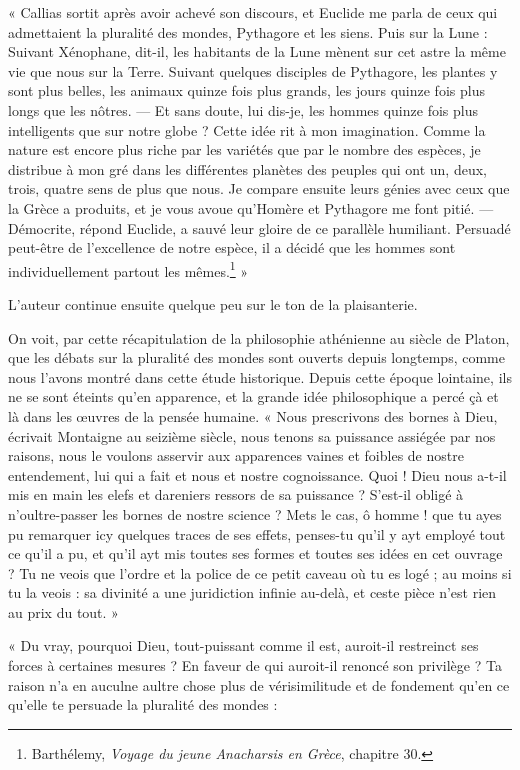 \documentclass[a4paper, 11pt, oneside]{article}
\begin{document}
« Callias sortit après avoir achevé son discours, et Euclide me parla de ceux qui admettaient la pluralité des mondes, Pythagore et les siens. Puis sur la Lune : Suivant Xénophane, dit-il, les habitants de la Lune mènent sur cet astre la même vie que nous sur la Terre. Suivant quelques disciples de Pythagore, les plantes y sont plus belles, les animaux quinze fois plus grands, les jours quinze fois plus longs que les nôtres. --- Et sans doute, lui dis-je, les hommes quinze fois plus intelligents que sur notre globe ? Cette idée rit à mon imagination. Comme la nature est encore plus riche par les variétés que par le nombre des espèces, je distribue à mon gré dans les différentes planètes des peuples qui ont un, deux, trois, quatre sens de plus que nous. Je compare ensuite leurs génies avec ceux que la Grèce a produits, et je vous avoue qu'Homère et Pythagore me font pitié. --- Démocrite, répond Euclide, a sauvé leur gloire de ce parallèle humiliant. Persuadé peut-être de l'excellence de notre espèce, il a décidé que les hommes sont individuellement partout les mêmes.\footnote{Barthélemy, \emph{Voyage du jeune Anacharsis en Grèce}, chapitre 30.} »

L'auteur continue ensuite quelque peu sur le ton de la plaisanterie.

On voit, par cette récapitulation de la philosophie athénienne au siècle de Platon, que les débats sur la pluralité des mondes sont ouverts depuis longtemps, comme nous l'avons montré dans cette étude historique. Depuis cette époque lointaine, ils ne se sont éteints qu'en apparence, et la grande idée philosophique a percé çà et là dans les œuvres de la pensée humaine. « Nous prescrivons des bornes à Dieu, écrivait Montaigne au seizième siècle, nous tenons sa puissance assiégée par nos raisons, nous le voulons asservir aux apparences vaines et foibles de nostre entendement, lui qui a fait et nous et nostre cognoissance. Quoi ! Dieu nous a-t-il mis en main les elefs et dareniers ressors de sa puissance ? S'est-il obligé à n'oultre-passer les bornes de nostre science ? Mets le cas, ô homme ! que tu ayes pu remarquer icy quelques traces de ses effets, penses-tu qu'il y ayt employé tout ce qu'il a pu, et qu'il ayt mis toutes ses formes et toutes ses idées en cet ouvrage ? Tu ne veois que l'ordre et la police de ce petit caveau où tu es logé ; au moins si tu la veois : sa divinité a une juridiction infinie au-delà, et ceste pièce n'est rien au prix du tout. »

« Du vray, pourquoi Dieu, tout-puissant comme il est, auroit-il restreinct ses forces à certaines mesures ? En faveur de qui auroit-il renoncé son privilège ? Ta raison n'a en auculne aultre chose plus de vérisimilitude et de fondement qu'en ce qu'elle te persuade la pluralité des mondes :
\end{document}
